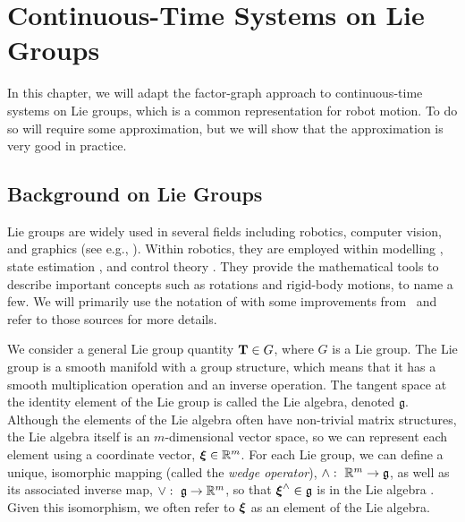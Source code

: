 
\chapter{Continuous-Time Systems on Lie Groups}\label{chapLieGroups}

In this chapter, we will adapt the factor-graph approach to continuous-time systems on Lie groups, which is a common representation for robot motion.  To do so will require some approximation, but we will show that the approximation is very good in practice.  

\section{Background on Lie Groups}

Lie groups are widely used in several fields including robotics, computer vision, and graphics (see e.g., \citet{chirikjian01,stillwell08,absil09,chirikjian09,chirikjian16,sola18,gallierDifferentialGeometryLie2020,boumal23}).  Within robotics, they are employed within modelling \citep{deleuterio85,park95,lynch17}, state estimation \citep{wang06,wang08,bonnabel08,blanco10,wolfe11,long12,forster15,dellaertFactorGraphsRobot2017,bonnabel17,mahony21,barfoot_ser24}, and control theory \citep{murray94,bullo95,sastry99}.  They provide the mathematical tools to describe important concepts such as rotations and rigid-body motions, to name a few.  We will primarily use the notation of \citet{barfoot_ser24} with some improvements from~\citet{sola18} and refer to those sources for more details.

We consider a general Lie group quantity $\mathbf{T} \in G$, where $G$ is a Lie group.  The Lie group is a smooth manifold with a group structure, which means that it has a smooth multiplication operation and an inverse operation.
The tangent space at the identity element of the Lie group is called the Lie algebra, denoted $\mathfrak{g}$.  
Although the elements of the Lie algebra often have non-trivial matrix structures, the Lie algebra itself is an $m$-dimensional vector space, so we can represent each element using a coordinate vector, ${\boldsymbol{\xi}}\in\mathbb{R}^m$. For each Lie group, we can define a unique, isomorphic mapping (called the {\em wedge operator}), $\wedge:~\mathbb{R}^m\rightarrow \mathfrak{g}$, as well as its associated inverse map, $\vee:~\mathfrak{g}\rightarrow \mathbb{R}^m$, so that ${\boldsymbol{\xi}}^\wedge \in \mathfrak{g}$ is in the Lie algebra . Given this isomorphism, we often refer to ${\boldsymbol{\xi}}$ as an element of the Lie algebra.


